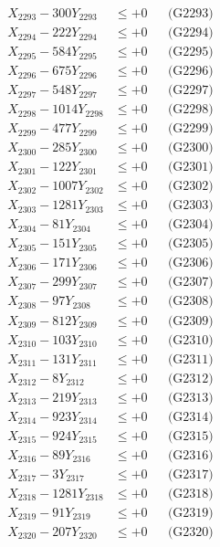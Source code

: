 \documentclass[a4paper,10pt]{article}
\begin{document}
{\begin{align}
X_{2293} - 300Y_{2293} &\leq +0 && \text{(G2293)} \\
X_{2294} - 222Y_{2294} &\leq +0 && \text{(G2294)} \\
X_{2295} - 584Y_{2295} &\leq +0 && \text{(G2295)} \\
X_{2296} - 675Y_{2296} &\leq +0 && \text{(G2296)} \\
X_{2297} - 548Y_{2297} &\leq +0 && \text{(G2297)} \\
X_{2298} - 1014Y_{2298} &\leq +0 && \text{(G2298)} \\
X_{2299} - 477Y_{2299} &\leq +0 && \text{(G2299)} \\
X_{2300} - 285Y_{2300} &\leq +0 && \text{(G2300)} \\
\allowbreak
X_{2301} - 122Y_{2301} &\leq +0 && \text{(G2301)} \\
X_{2302} - 1007Y_{2302} &\leq +0 && \text{(G2302)} \\
X_{2303} - 1281Y_{2303} &\leq +0 && \text{(G2303)} \\
X_{2304} - 81Y_{2304} &\leq +0 && \text{(G2304)} \\
X_{2305} - 151Y_{2305} &\leq +0 && \text{(G2305)} \\
X_{2306} - 171Y_{2306} &\leq +0 && \text{(G2306)} \\
X_{2307} - 299Y_{2307} &\leq +0 && \text{(G2307)} \\
X_{2308} - 97Y_{2308} &\leq +0 && \text{(G2308)} \\
X_{2309} - 812Y_{2309} &\leq +0 && \text{(G2309)} \\
X_{2310} - 103Y_{2310} &\leq +0 && \text{(G2310)} \\
\allowbreak
X_{2311} - 131Y_{2311} &\leq +0 && \text{(G2311)} \\
X_{2312} - 8Y_{2312} &\leq +0 && \text{(G2312)} \\
X_{2313} - 219Y_{2313} &\leq +0 && \text{(G2313)} \\
X_{2314} - 923Y_{2314} &\leq +0 && \text{(G2314)} \\
X_{2315} - 924Y_{2315} &\leq +0 && \text{(G2315)} \\
X_{2316} - 89Y_{2316} &\leq +0 && \text{(G2316)} \\
X_{2317} - 3Y_{2317} &\leq +0 && \text{(G2317)} \\
X_{2318} - 1281Y_{2318} &\leq +0 && \text{(G2318)} \\
X_{2319} - 91Y_{2319} &\leq +0 && \text{(G2319)} \\
X_{2320} - 207Y_{2320} &\leq +0 && \text{(G2320)} \\

\end{align}}
\end{document}
